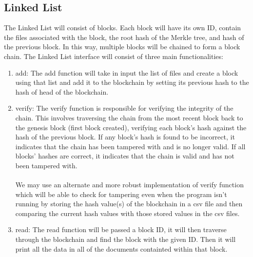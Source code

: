\documentclass{article}
\begin{document}
\subsection{Linked List}
The Linked List will consist of blocks. Each block will have its own ID, contain the files associated with the block, the root hash of the Merkle 
tree, and hash of the previous block. In this way, multiple blocks 
will be chained to form a block chain. The Linked List interface will consist of three main functionalities:
\begin{enumerate}
\item add: The add function will take in input the list of files and create a block using that list and add it to the blockchain by setting its previous hash to the hash of head of the blockchain. 
\item verify: The verify function is responsible for verifying the integrity of the chain. This involves traversing the chain from the most recent block back to the genesis block (first block created), verifying each block's hash against the hash of the previous block. If any block's hash is found to be incorrect, it indicates that the chain has been tampered with and is no longer valid. If all blocks' hashes are correct, it indicates that the chain is valid and has not been tampered with. 
\\\\ We may use an alternate and more robust implementation of verify function which will 
be able to check for tampering even when the program isn't running by storing the hash value(s) of the blockchain
in a csv file and then comparing the current hash values with those stored values in the csv files. 
\item read: The read function will be passed a block ID, it will then traverse through the blockchain and find the block with the given ID. Then it will print all the data in all of the documents containted within that block. 
\end{enumerate}
\end{document}
